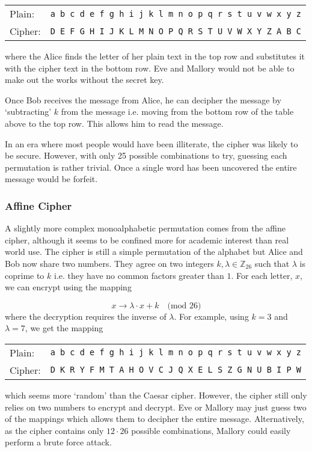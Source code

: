 \begin{center}
\begin{tabular}{l l}%
	Plain:  &\quad\texttt{a b c d e f g h i j k l m n o p q r s t u v w x y z} \\ 
	Cipher: &\quad\texttt{D E F G H I J K L M N O P Q R S T U V W X Y Z A B C} \\
\end{tabular}
\end{center}
where the Alice finds the letter of her plain text in the top row and substitutes it with the cipher text in the bottom row. Eve and Mallory would not be able to make out the works without the secret key. 

Once Bob receives the message from Alice, he can decipher the message by `subtracting' $k$ from the message i.e. moving from the bottom row of the table above to the top row. This allows him to read the message.

In an era where most people would have been illiterate, the cipher was likely to be secure. However, with only 25 possible combinations to try, guessing each permutation is rather trivial. Once a single word has been uncovered the entire message would be forfeit. 

\subsubsection*{Affine Cipher}

A slightly more complex monoalphabetic permutation comes from the affine cipher, although it seems to be confined more for academic interest than real world use. The cipher is still a simple permutation of the alphabet but Alice and Bob now share two numbers. They agree on two integers $k,\lambda\in \mathbb{Z}_{26}$ such that $\lambda$ is coprime to $k$ i.e. they have no common factors greater than $1$. For each letter, $x$, we can encrypt using the mapping

\begin{equation}
	x \rightarrow \lambda \cdot x + k\quad\text{(mod 26)}
\end{equation}
where the decryption requires the inverse of $\lambda$. For example, using $k = 3$ and $\lambda = 7$, we get the mapping

\begin{center}
\begin{tabular}{l l}
	Plain:  &\quad\texttt{a b c d e f g h i j k l m n o p q r s t u v w x y z} \\ 
	Cipher: &\quad\texttt{D K R  Y F M T A H O V C J Q X E L S Z G N U B I P W} \\
\end{tabular}
\end{center}
which seems more `random' than the Caesar cipher. However, the cipher still only relies on two numbers to encrypt and decrypt. Eve or Mallory may just guess two of the mappings which allows them to decipher the entire message. Alternatively, as the cipher contains only $12 \cdot 26$ possible combinations, Mallory could easily perform a brute force attack.

